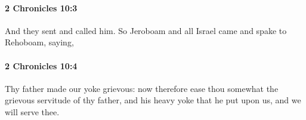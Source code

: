 		\paragraph{2 Chronicles 10:3} %
			\label{2CHRONICLES-10-3}

			And they sent and called him. So Jeroboam and all Israel came and spake to Rehoboam, saying,


		\paragraph{2 Chronicles 10:4} %
			\label{2CHRONICLES-10-4}

			Thy father made our yoke grievous: now therefore ease thou somewhat the grievous servitude of thy father, and his heavy yoke that he put upon us, and we will serve thee.


